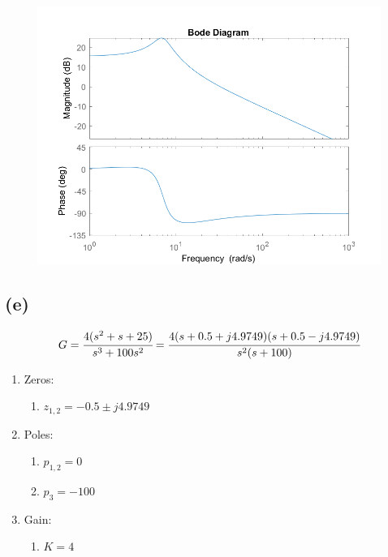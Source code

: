 \documentclass[letter]{article}
\numberwithin{equation}{section}
\begin{document}
\begin{figure}[h!]
	\centering
	\includegraphics[width=\textwidth]{figs/pblm2d.png}
\end{figure}



\newpage
\subsection{(e)}
\[
	G = \cfrac{
		4 (s^2 + s + 25)
	}{
		s^3 + 100s^2
	}
	= \cfrac{
		4 (s + 0.5 + j 4.9749) (s + 0.5 - j 4.9749)
	}{
		s^2 (s+100)
	}
\]
\begin{enumerate}
	\item Zeros:
	\begin{enumerate}
		\item $z_{1,2} = -0.5 \pm j 4.9749$
	\end{enumerate}
	\item Poles:
	\begin{enumerate}
		\item $p_{1,2} = 0$
		\item $p_3 = -100$
	\end{enumerate}
	\item Gain:
	\begin{enumerate}
		\item $K = 4$
	\end{enumerate}
\end{enumerate}
\end{document}

